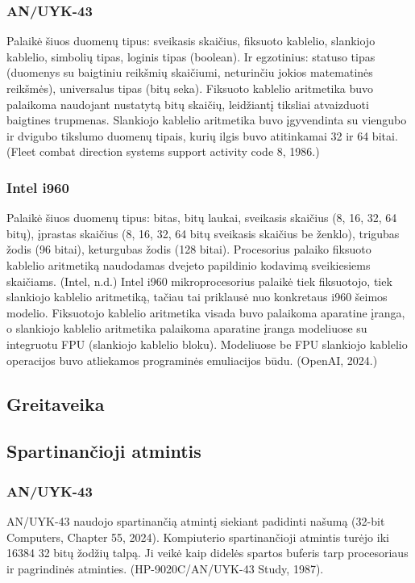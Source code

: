 \documentclass{article}
\begin{document}
\subsubsection{AN/UYK-43}
Palaikė šiuos duomenų tipus: sveikasis skaičius, fiksuoto kablelio, slankiojo kablelio, simbolių tipas, loginis tipas (boolean). Ir egzotinius: statuso tipas (duomenys su baigtiniu reikšmių skaičiumi, neturinčiu jokios matematinės reikšmės), universalus tipas (bitų seka). Fiksuoto kablelio aritmetika buvo palaikoma naudojant nustatytą bitų skaičių, leidžiantį tiksliai atvaizduoti baigtines trupmenas. Slankiojo kablelio aritmetika buvo įgyvendinta su viengubo ir dvigubo tikslumo duomenų tipais, kurių ilgis buvo atitinkamai 32 ir 64 bitai. (Fleet combat direction systems support activity code 8, 1986.)
\subsubsection{Intel i960}
Palaikė šiuos duomenų tipus: bitas, bitų laukai, sveikasis skaičius (8, 16, 32, 64 bitų), įprastas skaičius (8, 16, 32, 64 bitų sveikasis skaičius be ženklo), trigubas žodis (96 bitai), keturgubas žodis (128 bitai). Procesorius palaiko fiksuoto kablelio aritmetiką naudodamas dvejeto papildinio kodavimą sveikiesiems skaičiams. (Intel, n.d.) Intel i960 mikroprocesorius palaikė tiek fiksuotojo, tiek slankiojo kablelio aritmetiką, tačiau tai priklausė nuo konkretaus i960 šeimos modelio. Fiksuotojo kablelio aritmetika visada buvo palaikoma aparatine įranga, o slankiojo kablelio aritmetika palaikoma aparatine įranga modeliuose su integruotu FPU (slankiojo kablelio bloku). Modeliuose be FPU slankiojo kablelio operacijos buvo atliekamos programinės emuliacijos būdu. (OpenAI, 2024.)
\subsection{Greitaveika}

\subsection{Spartinančioji atmintis}
\subsubsection{AN/UYK-43}
AN/UYK-43 naudojo spartinančią atmintį siekiant padidinti našumą (32-bit Computers, Chapter 55, 2024). Kompiuterio spartinančioji atmintis turėjo iki 16384 32 bitų žodžių talpą. Ji veikė kaip didelės spartos buferis tarp procesoriaus ir pagrindinės atminties. (HP-9020C/AN/UYK-43 Study, 1987).
\end{document}
